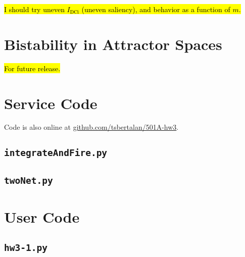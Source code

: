 \documentclass[letterpaper,10pt]{article}
\newcommand{\code}[1]{
\subsection{\texttt{#1}}
\label{sec:#1}
\texttt{}
}
\begin{document}
\hl{I should try uneven $I_\mathrm{DCi}$ (uneven saliency), and behavior
as a function of $m$.}

\newpage
\section{Bistability in Attractor Spaces}
\hl{For future release.}

\section{Service Code}
\label{sec:serviceCode}
Code is also online at
\href{https://github.com/tsbertalan/501A-hw3}{github.com/tsbertalan/501A-hw3}.

\code{integrateAndFire.py}

\newpage
\code{twoNet.py}

\newpage
\section{User Code}
\label{sec:userCode}
\code{hw3-1.py}
\end{document}

